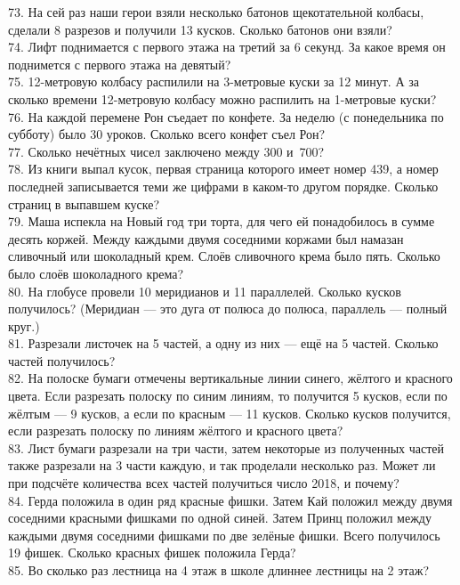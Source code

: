 73. На сей раз наши герои взяли несколько батонов щекотательной колбасы, сделали 8 разрезов и получили 13 кусков. Сколько батонов они взяли?\\
74. Лифт поднимается с первого этажа на третий за 6 секунд. За какое время он поднимется с первого этажа на девятый?\\
75. 12-метровую колбасу распилили на 3-метровые куски за 12 минут. А за сколько времени 12-метровую колбасу можно распилить на 1-метровые куски?\\
76. На каждой перемене Рон съедает по конфете. За неделю (с понедельника по субботу) было 30 уроков. Сколько всего конфет съел Рон?\\
77. Сколько нечётных чисел заключено между 300 и 700?\\
78. Из книги выпал кусок, первая страница которого имеет номер 439, а номер последней записывается теми же цифрами в каком-то другом порядке. Сколько страниц в выпавшем куске?\\
79. Маша испекла на Новый год три торта, для чего ей понадобилось в сумме десять коржей. Между каждыми двумя соседними коржами был намазан сливочный или шоколадный крем. Слоёв сливочного крема было пять. Сколько было слоёв шоколадного крема?\\
80. На глобусе провели 10 меридианов и 11 параллелей. Сколько кусков получилось? (Меридиан --- это дуга от полюса до полюса, параллель --– полный круг.)\\
81. Разрезали листочек на 5 частей, а одну из них --- ещё на 5 частей. Сколько частей получилось?\\
82. На полоске бумаги отмечены вертикальные линии синего, жёлтого и красного цвета. Если разрезать полоску по синим линиям, то получится 5 кусков, если по жёлтым --- 9 кусков, а если по красным --- 11 кусков. Сколько кусков получится, если разрезать полоску по линиям жёлтого и красного цвета?\\
83. Лист бумаги разрезали на три части, затем некоторые из полученных частей также разрезали на 3 части каждую, и так проделали несколько раз. Может ли при подсчёте количества всех частей получиться число 2018, и почему?\\
84. Герда положила в один ряд красные фишки. Затем Кай положил между двумя соседними красными фишками по одной синей. Затем Принц положил между каждыми двумя соседними фишками по две зелёные фишки. Всего получилось 19 фишек. Сколько красных фишек положила Герда?\\
85. Во сколько раз лестница на 4 этаж в школе длиннее лестницы на 2 этаж?\\
